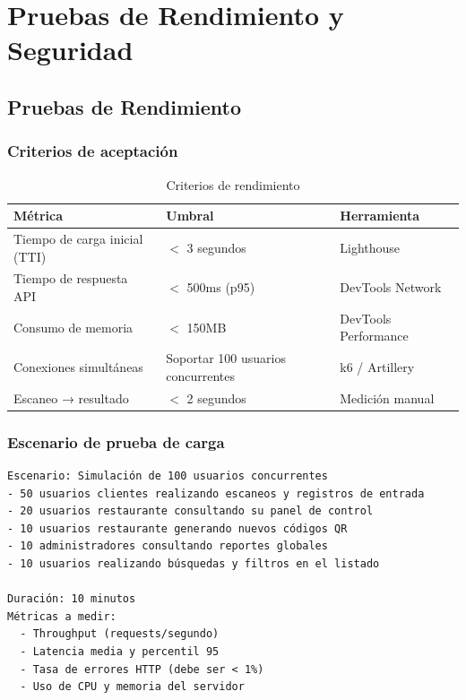 \section{Pruebas de Rendimiento y Seguridad}

\subsection{Pruebas de Rendimiento}

\subsubsection{Criterios de aceptación}

\begin{table}[H]
    \centering
    \caption{Criterios de rendimiento}
    \label{tab:rendimiento_criterios}
    \begin{tabular}{|>{\raggedright\arraybackslash}p{}|>{\raggedright\arraybackslash}p{}|>{\raggedright\arraybackslash}p{}|}
        \hline
        \textbf{Métrica} & \textbf{Umbral} & \textbf{Herramienta} \\
        \hline
        Tiempo de carga inicial (TTI) & $<$ 3 segundos & Lighthouse \\
        \hline
        Tiempo de respuesta API & $<$ 500ms (p95) & DevTools Network \\
        \hline
        Consumo de memoria & $<$ 150MB & DevTools Performance \\
        \hline
        Conexiones simultáneas & Soportar 100 usuarios concurrentes & k6 / Artillery \\
        \hline
        Escaneo → resultado & $<$ 2 segundos & Medición manual \\
        \hline
    \end{tabular}
\end{table}

\subsubsection{Escenario de prueba de carga}

\begin{verbatim}
Escenario: Simulación de 100 usuarios concurrentes
- 50 usuarios clientes realizando escaneos y registros de entrada
- 20 usuarios restaurante consultando su panel de control
- 10 usuarios restaurante generando nuevos códigos QR
- 10 administradores consultando reportes globales
- 10 usuarios realizando búsquedas y filtros en el listado

Duración: 10 minutos
Métricas a medir:
  - Throughput (requests/segundo)
  - Latencia media y percentil 95
  - Tasa de errores HTTP (debe ser < 1%)
  - Uso de CPU y memoria del servidor
\end{verbatim}

